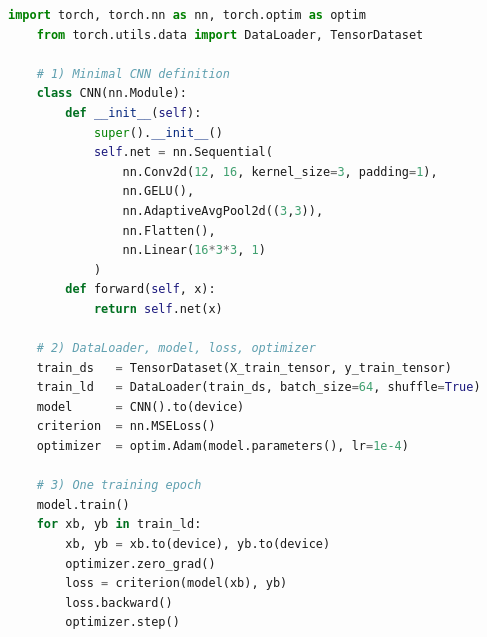 \documentclass[8pt,twocolumn]{article}
\begin{document}
  \begin{lstlisting}[language=Python]
    import torch, torch.nn as nn, torch.optim as optim
    from torch.utils.data import DataLoader, TensorDataset
    
    # 1) Minimal CNN definition
    class CNN(nn.Module):
        def __init__(self):
            super().__init__()
            self.net = nn.Sequential(
                nn.Conv2d(12, 16, kernel_size=3, padding=1),
                nn.GELU(),
                nn.AdaptiveAvgPool2d((3,3)),
                nn.Flatten(),
                nn.Linear(16*3*3, 1)
            )
        def forward(self, x):
            return self.net(x)
    
    # 2) DataLoader, model, loss, optimizer
    train_ds   = TensorDataset(X_train_tensor, y_train_tensor)
    train_ld   = DataLoader(train_ds, batch_size=64, shuffle=True)
    model      = CNN().to(device)
    criterion  = nn.MSELoss()
    optimizer  = optim.Adam(model.parameters(), lr=1e-4)
    
    # 3) One training epoch
    model.train()
    for xb, yb in train_ld:
        xb, yb = xb.to(device), yb.to(device)
        optimizer.zero_grad()
        loss = criterion(model(xb), yb)
        loss.backward()
        optimizer.step()
    \end{lstlisting}
    
\end{document}
